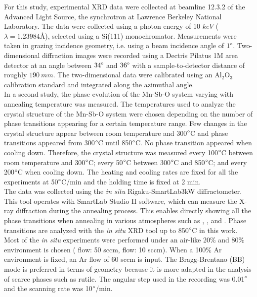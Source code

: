 For this study, experimental XRD data were collected at beamline 12.3.2 of the Advanced Light Source, the synchrotron at Lawrence Berkeley National Laboratory. The data were collected using a photon energy of 10 $\si{keV}$ ($\lambda = 1.23984 \text{\AA}$), selected using a Si(111) monochromator. Measurements were taken in grazing incidence geometry, i.e. using a beam incidence angle of $1\degree$. Two-dimensional diffraction images were recorded using a Dectris Pilatus 1M area detector at an angle between $34\degree$ and $36\degree$ with a sample-to-detector distance of roughly $190 \ \si{mm}$. The two-dimensional data were calibrated using an Al$_{2}$O$_{3}$ calibration standard and integrated along the azimuthal angle. \\


In a second study, the phase evolution of the Mn-Sb-O system varying with annealing temperature was measured. The temperatures used to analyze the crystal structure of the Mn-Sb-O system were chosen depending on the number of phase transitions appearing for a certain temperature range. Few changes in the crystal structure appear between room temperature and 300$\degree$C and phase transitions appeared from 300$\degree$C until 850$\degree$C. No phase transition appeared when cooling down. Therefore, the crystal structure was measured every 100$\degree$C between room temperature and 300$\degree$C; every 50$\degree$C between 300$\degree$C and 850$\degree$C; and every 200$\degree$C when cooling down. The heating and cooling rates are fixed for all the experiments at 50$\degree$C/min and the holding time is fixed at 2 min. \\

The data was collected using the \textit{in situ}  Rigaku-SmartLab3kW diffractometer. This tool operates with SmartLab Studio II software, which can measure the X-ray diffraction during the annealing process. This enables directly showing all the phase transitions when annealing in various atmospheres such as , , and . Phase transitions are analyzed with the \textit{in situ} XRD tool up to 850$\degree$C in this work. Most of the \textit{in situ} experiments were performed under an air-like 20\%  and 80\%  environment is chosen ( flow: 50 \si{sccm},  flow: 10 \si{sccm}). When a 100\% Ar environment is fixed, an Ar flow of 60 \si{sccm} is input. The Bragg-Brentano (BB) mode is preferred in terms of geometry because it is more adapted in the analysis of scarce phases such as   rutile. The angular step used in the recording was 0.01$\degree$ and the scanning rate was 10$\degree$/min. 




